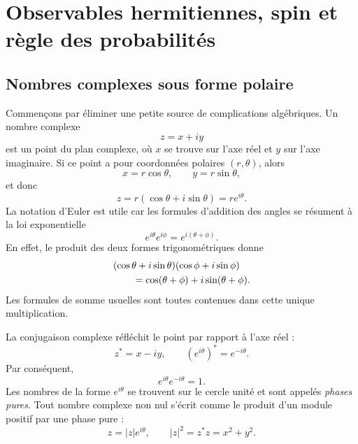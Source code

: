 \chapter{Observables hermitiennes, spin et règle des probabilités}


\section{Nombres complexes sous forme polaire}

Commençons par éliminer une petite source de complications algébriques. Un nombre complexe
\begin{equation}
  z=x+iy
\end{equation}
est un point du plan complexe, où \(x\) se trouve sur l’axe réel et \(y\) sur l’axe imaginaire. Si ce point a pour coordonnées polaires \((r,\theta)\), alors
\begin{equation}
  x=r\cos\theta,
  \qquad
  y=r\sin\theta,
\end{equation}
et donc
\begin{equation}
  z=r(\cos\theta+i\sin\theta)=re^{i\theta}.
  \label{eq:l03-polar-form}
\end{equation}
La notation d’Euler est utile car les formules d’addition des angles se résument à la loi exponentielle
\begin{equation}
  e^{i\theta}e^{i\phi}
  =e^{i(\theta+\phi)}.
  \label{eq:l03-phase-product}
\end{equation}
En effet, le produit des deux formes trigonométriques donne
\begin{align}
& (\cos\theta+i\sin\theta)(\cos\phi+i\sin\phi)
\notag\\
&\qquad=\cos(\theta+\phi)+i\sin(\theta+\phi).
\end{align}
Les formules de somme usuelles sont toutes contenues dans cette unique multiplication.

La conjugaison complexe réfléchit le point par rapport à l’axe réel :
\begin{equation}
  z^*=x-iy,
  \qquad
  (e^{i\theta})^*=e^{-i\theta}.
\end{equation}
Par conséquent,
\begin{equation}
  e^{i\theta}e^{-i\theta}=1.
\end{equation}
Les nombres de la forme \(e^{i\theta}\) se trouvent sur le cercle unité et sont appelés \emph{phases pures}. Tout nombre complexe non nul s’écrit comme le produit d’un module positif par une phase pure :
\begin{equation}
  z=|z|e^{i\theta},
  \qquad
  |z|^2=z^*z=x^2+y^2.
  \label{eq:l03-modulus-phase}
\end{equation}

